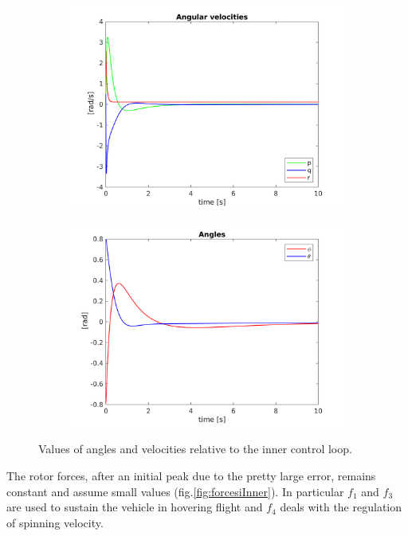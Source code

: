 \documentclass[11pt,a4paper]{scrartcl}
\begin{document}
\begin{figure}[H]
	\centering
	\begin{subfigure}[h!]{0.7\linewidth}
	\centering
	\includegraphics[width=\textwidth]{Images/innerControlVel}
	\caption{}
	\label{fig:innercontrolvel}	
	\end{subfigure} \hfill
	\begin{subfigure}[h!]{0.7\linewidth}
	\centering
	\includegraphics[width=\textwidth]{Images/innerControlAngles}
	\caption{}
	\label{fig:innercontrolangles}
	\end{subfigure}	
	\caption{Values of angles and velocities relative to the inner control loop.}
\end{figure}

The rotor forces, after an initial peak due to the pretty large error, remains constant and assume small values (fig.\ref{fig:forcesiInner}). In particular $ f_1 $ and $ f_3 $ are used to sustain the vehicle in hovering flight and $ f_4 $ deals with the regulation of spinning velocity.
\end{document}
